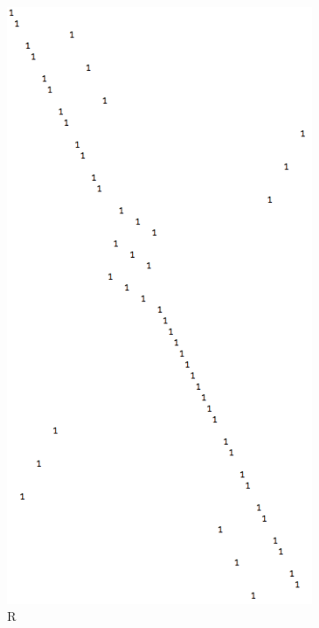 \documentclass[11pt, oneside]{article}
\theoremstyle{plain}
\begin{document}
\begin{figure}[h!]
    \centering
    \begin{subfigure}[h]{0.4 \textwidth}
        \includegraphics[scale=0.30]{R}
        \caption{R}
    \end{subfigure}
    \hfill
    \begin{subfigure}[h]{0.4 \textwidth}

\end{subfigure}
\end{figure}
\end{document}
